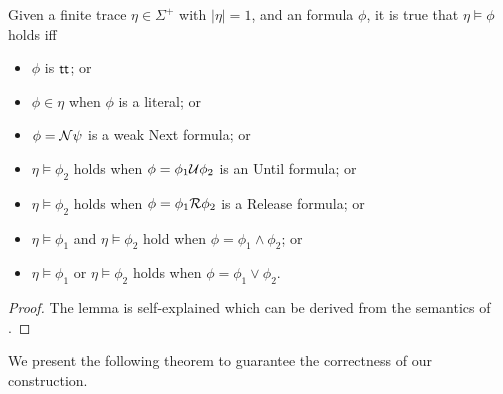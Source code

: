 \begin{theorem}\label{thm:oneSat}
Given a finite trace $\eta \in \Sigma^{+}$ with $|\eta|=1$, and an \ltlf formula $\phi$, it is true that $\eta \models \phi$ holds iff
\begin{itemize}
	\item $\phi$ is $\tt$; or 
	\item $\phi \in\eta$ when $\phi$ is a literal; or
	\item $\phi=\N \psi$ is a weak Next formula; or
	\item $\eta \models \phi_{2}$ holds when $\phi=\phi_{1} \U \phi_{2}$ is an Until formula; or  
	\item $\eta \models \phi_{2}$ holds when $\phi=\phi_{1} \R \phi_{2}$ is a Release formula; or
	\item $\eta \models \phi_{1}$ and $\eta \models \phi_{2}$ hold when $\phi=\phi_{1} \wedge \phi_{2}$; or
	\item $\eta \models \phi_{1}$ or $\eta \models \phi_{2}$ holds when $\phi=\phi_{1} \vee \phi_{2}$.
\end{itemize}
\end{theorem}

\begin{proof}
The lemma is self-explained which can be derived from the semantics of \ltlf.
\end{proof}

We present the following theorem to guarantee the correctness of our construction. 

